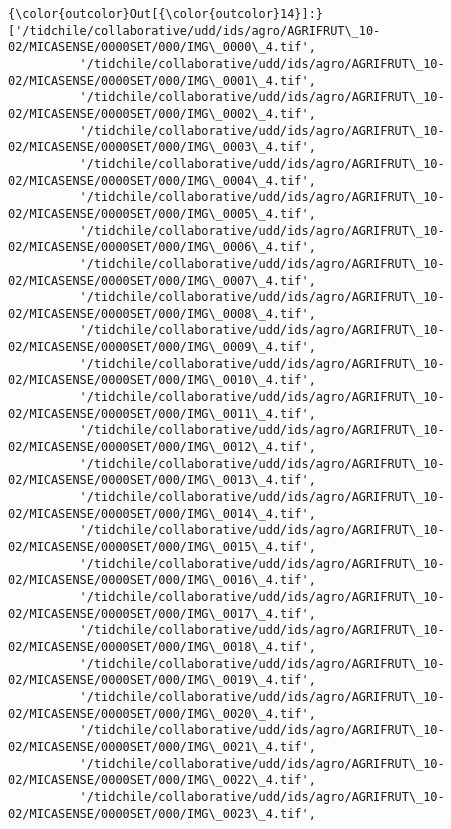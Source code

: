 \documentclass[11pt]{article}
\begin{document}
\begin{Verbatim}[commandchars=\\\{\}]
{\color{outcolor}Out[{\color{outcolor}14}]:} ['/tidchile/collaborative/udd/ids/agro/AGRIFRUT\_10-02/MICASENSE/0000SET/000/IMG\_0000\_4.tif',
          '/tidchile/collaborative/udd/ids/agro/AGRIFRUT\_10-02/MICASENSE/0000SET/000/IMG\_0001\_4.tif',
          '/tidchile/collaborative/udd/ids/agro/AGRIFRUT\_10-02/MICASENSE/0000SET/000/IMG\_0002\_4.tif',
          '/tidchile/collaborative/udd/ids/agro/AGRIFRUT\_10-02/MICASENSE/0000SET/000/IMG\_0003\_4.tif',
          '/tidchile/collaborative/udd/ids/agro/AGRIFRUT\_10-02/MICASENSE/0000SET/000/IMG\_0004\_4.tif',
          '/tidchile/collaborative/udd/ids/agro/AGRIFRUT\_10-02/MICASENSE/0000SET/000/IMG\_0005\_4.tif',
          '/tidchile/collaborative/udd/ids/agro/AGRIFRUT\_10-02/MICASENSE/0000SET/000/IMG\_0006\_4.tif',
          '/tidchile/collaborative/udd/ids/agro/AGRIFRUT\_10-02/MICASENSE/0000SET/000/IMG\_0007\_4.tif',
          '/tidchile/collaborative/udd/ids/agro/AGRIFRUT\_10-02/MICASENSE/0000SET/000/IMG\_0008\_4.tif',
          '/tidchile/collaborative/udd/ids/agro/AGRIFRUT\_10-02/MICASENSE/0000SET/000/IMG\_0009\_4.tif',
          '/tidchile/collaborative/udd/ids/agro/AGRIFRUT\_10-02/MICASENSE/0000SET/000/IMG\_0010\_4.tif',
          '/tidchile/collaborative/udd/ids/agro/AGRIFRUT\_10-02/MICASENSE/0000SET/000/IMG\_0011\_4.tif',
          '/tidchile/collaborative/udd/ids/agro/AGRIFRUT\_10-02/MICASENSE/0000SET/000/IMG\_0012\_4.tif',
          '/tidchile/collaborative/udd/ids/agro/AGRIFRUT\_10-02/MICASENSE/0000SET/000/IMG\_0013\_4.tif',
          '/tidchile/collaborative/udd/ids/agro/AGRIFRUT\_10-02/MICASENSE/0000SET/000/IMG\_0014\_4.tif',
          '/tidchile/collaborative/udd/ids/agro/AGRIFRUT\_10-02/MICASENSE/0000SET/000/IMG\_0015\_4.tif',
          '/tidchile/collaborative/udd/ids/agro/AGRIFRUT\_10-02/MICASENSE/0000SET/000/IMG\_0016\_4.tif',
          '/tidchile/collaborative/udd/ids/agro/AGRIFRUT\_10-02/MICASENSE/0000SET/000/IMG\_0017\_4.tif',
          '/tidchile/collaborative/udd/ids/agro/AGRIFRUT\_10-02/MICASENSE/0000SET/000/IMG\_0018\_4.tif',
          '/tidchile/collaborative/udd/ids/agro/AGRIFRUT\_10-02/MICASENSE/0000SET/000/IMG\_0019\_4.tif',
          '/tidchile/collaborative/udd/ids/agro/AGRIFRUT\_10-02/MICASENSE/0000SET/000/IMG\_0020\_4.tif',
          '/tidchile/collaborative/udd/ids/agro/AGRIFRUT\_10-02/MICASENSE/0000SET/000/IMG\_0021\_4.tif',
          '/tidchile/collaborative/udd/ids/agro/AGRIFRUT\_10-02/MICASENSE/0000SET/000/IMG\_0022\_4.tif',
          '/tidchile/collaborative/udd/ids/agro/AGRIFRUT\_10-02/MICASENSE/0000SET/000/IMG\_0023\_4.tif',

\end{Verbatim}
\end{document}
